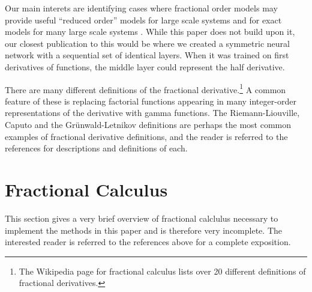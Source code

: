 \documentclass[letterpaper, 10 pt, conference]{ieeeconf}  %
\begin{document}
  Our main interets are identifying cases where fractional order models may
  provide useful ``reduced order'' models for large scale systems
  \cite{goodwinemed2023,goodwinemmar2023} and for exact models for many large
  scale systems
  \cite{Goodwine2014Modeling,Leyden2016Using,Leyden2019Large,bg:xnids2022,bg:xninonlinear2020}.
  While this paper does not build upon it, our closest publication to this would
  be \cite{bg:chenSII2022} where we created a symmetric neural network with a
  sequential set of identical layers. When it was trained on first derivatives
  of functions, the middle layer could represent the half derivative. 
 
 There are many different definitions of the fractional derivative.\footnote{The
 Wikipedia page for fractional calculus lists over 20 different definitions of
 fractional derivatives.} A common feature of these is replacing factorial
 functions appearing in many integer-order representations of the derivative
 with gamma functions. The Riemann-Liouville, Caputo and the Gr\"unwald-Letnikov
 definitions are perhaps the most common examples of fractional derivative
 definitions, and the reader is referred to the references
 \cite{Machado20111140,4609961,series/lnee/Ortigueira11,das2011functional} for
 descriptions and definitions of each.

  \section{Fractional Calculus}

  This section gives a very brief overview of fractional calclulus necessary to
  implement the methods in this paper and is therefore very incomplete. The
  interested reader is referred to the references above for a complete
  exposition.
\end{document}
